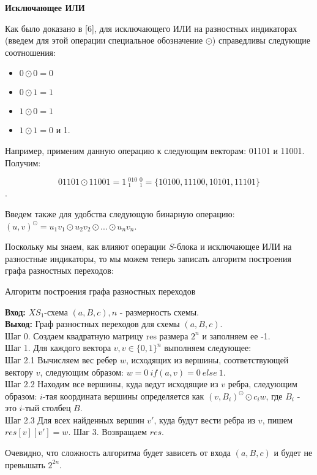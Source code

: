 \documentclass[a4paper,12pt]{report}
\theoremstyle{plain} %
\theoremstyle{definition}
\theoremstyle{remark}
\begin{document}
\begin{large}
\textbf{Исключающее ИЛИ}

 Как было доказано в [6], для исключающего ИЛИ на разностных индикаторах (введем для этой операции специальное обозначение $\odot$) справедливы следующие соотношения:

\begin{itemize}
\item $0 \odot 0 = 0$
\item $0 \odot 1 = 1$
\item $1 \odot 0= 1$
\item $1 \odot 1 = 0$ и 1. 
\end{itemize}

Например, применим данную операцию к следующим векторам: 01101 и 11001. Получим:

$$01101 \odot 11001 = 1~_{1}^010~_{1}^0 = \{10100, 11100, 10101, 11101\}$$.

Введем также для удобства следующую бинарную операцию: $(u, v)^{\odot} = u_1v_1 \odot u_2v_2 \odot ... \odot u_nv_n$.

Поскольку мы знаем, как влияют операции $S$-блока и исключающее ИЛИ на разностные индикаторы, то мы можем теперь записать алгоритм построения графа разностных переходов:

\begin{algorithm}[H]
\caption{Алгоритм построения графа разностных переходов}
\label{diff_graph_construct}
\textbf{Вход:} $XS_1$-схема $(a, B, c), n$ - размерность схемы.\\
\textbf{Выход:} Граф разностных переходов для схемы $(a, B, c)$.\\
Шаг 0. Создаем квадратную матрицу res размера $2^n$ и заполняем ее -1. \\
Шаг 1. Для каждого вектора $v, v \in \{0, 1\}^n$ выполняем следующее: \\
Шаг 2.1 Вычисляем вес ребер $w$, исходящих из вершины, соответствующей вектору $v$, следующим образом: $w = 0~ if (a,v) = 0 ~else ~1$.\\
Шаг 2.2 Находим все вершины, куда ведут исходящие из $v$ ребра, следующим образом: $i$-тая координата вершины определяется как $(v, B_i)^{\odot} \odot c_iw$, где $B_i$ - это $i$-тый столбец $B$. \\
Шаг 2.3 Для всех найденных вершин $v'$, куда будут вести ребра из $v$, пишем $res[v][v'] = w$.
Шаг 3. Возвращаем $res$.\\
\end{algorithm}

Очевидно, что сложность алгоритма будет зависеть от входа $(a,B,c)$ и будет не превышать $2^{2n}$.


\end{large}
\end{document}

